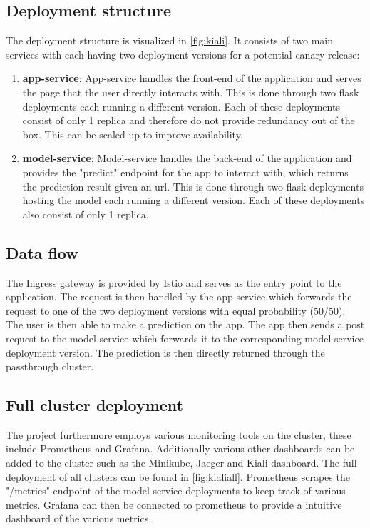 \subsection{Deployment structure}
The deployment structure is visualized in \autoref{fig:kiali}. It consists of two main services with each having two deployment versions for a potential canary release:

\begin{enumerate}
    \item \textbf{app-service}: App-service handles the front-end of the application and serves the page that the user directly interacts with. This is done through two flask deployments each running a different version. Each of these deployments consist of only 1 replica and therefore do not provide redundancy out of the box. This can be scaled up to improve availability.
    \item \textbf{model-service}: Model-service handles the back-end of the application and provides the "predict" endpoint for the app to interact with, which returns the prediction result given an url. This is done through two flask deployments hosting the model each running a different version. Each of these deployments also consist of only 1 replica.
\end{enumerate}


\subsection{Data flow}
The Ingress gateway is provided by Istio and serves as the entry point to the application. The request is then handled by the app-service which forwards the request to one of the two deployment versions with equal probability (50/50). The user is then able to make a prediction on the app. The app then sends a post request to the model-service which forwards it to the corresponding model-service deployment version. The prediction is then directly returned through the passthrough cluster.

\subsection{Full cluster deployment}
The project furthermore employs various monitoring tools on the cluster, these include Prometheus and Grafana. Additionally various other dashboards can be added to the cluster such as the Minikube, Jaeger and Kiali dashboard. The full deployment of all clusters can be found in \autoref{fig:kialiall}. Prometheus scrapes the "/metrics" endpoint of the model-service deployments to keep track of various metrics. Grafana can then be connected to prometheus to provide a intuitive dashboard of the various metrics.


